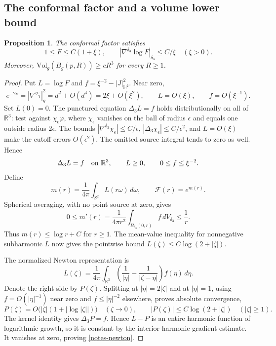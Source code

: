 \documentclass[letterpaper]{amsart}
\newtheorem{prop}[thm]{Proposition}
\theoremstyle{definition}
\theoremstyle{remark}
\def\Vol{\mathrm{Vol}}
\begin{document}
\subsection{The conformal factor and a volume lower bound}\label{subsec-volume}
\begin{prop}\label{prop-conformal-volume}
The conformal factor satisfies
\[
 1\le F\le C(1+\xi),\qquad
 |\nabla^{\delta_3}\log F|_{\delta_3}\le C/\xi\quad(\xi>0).
\]
Moreover, $\Vol_g(B_g(p,R))\ge cR^3$ for every $R\ge1$.
\end{prop}
\begin{proof}
Put $L=\log F$ and $f=\xi^{-2}-|J|_{\mathbb H^2}^2$. Near zero,
\[
 e^{-2\nu}=|\nabla^g\tilde\tau|_g^2=d^2+O(d^4)=2\xi+O(\xi^2),
 \qquad L=O(\xi),\qquad f=O(\xi^{-1}).
\]
Set $L(0)=0$. The punctured equation $\Delta_3L=f$ holds distributionally on all of $\mathbb R^3$: test against $\chi_\epsilon\varphi$, where $\chi_\epsilon$ vanishes on the ball of radius $\epsilon$ and equals one outside radius $2\epsilon$. The bounds $|\nabla^{\delta_3}\chi_\epsilon|\le C/\epsilon$, $|\Delta_3\chi_\epsilon|\le C/\epsilon^2$, and $L=O(\xi)$ make the cutoff errors $O(\epsilon^2)$. The omitted source integral tends to zero as well. Hence
\[
 \Delta_3L=f\quad\hbox{on }\mathbb R^3,\qquad
 L\ge0,\qquad 0\le f\le\xi^{-2}.
\]
Define
\[
 m(r)=\frac1{4\pi}\int_{S^2}L(r\omega)\,d\omega,
 \qquad \mathcal F(r)=e^{m(r)}.
\]
Spherical averaging, with no point source at zero, gives
\[
 0\le m'(r)=\frac1{4\pi r^2}\int_{B_{\delta_3}(0,r)}f\,dV_{\delta_3}
       \le\frac1r.
\]
Thus $m(r)\le\log r+C$ for $r\ge1$. The mean-value inequality for nonnegative subharmonic $L$ now gives the pointwise bound $L(\zeta)\le C\log(2+|\zeta|)$.

The normalized Newton representation is
\begin{equation}\label{notes-newton}
 L(\zeta)=\frac1{4\pi}\int_{\mathbb R^3}
 \left(\frac1{|\eta|}-\frac1{|\zeta-\eta|}\right)f(\eta)\,d\eta.
\end{equation}
Denote the right side by $P(\zeta)$. Splitting at $|\eta|=2|\zeta|$ and at $|\eta|=1$, using $f=O(|\eta|^{-1})$ near zero and $f\le|\eta|^{-2}$ elsewhere, proves absolute convergence,
\[
 P(\zeta)=O\bigl(|\zeta|(1+|\log|\zeta||)\bigr)\quad(\zeta\to0),
 \qquad |P(\zeta)|\le C\log(2+|\zeta|)\quad(|\zeta|\ge1).
\]
The kernel identity gives $\Delta_3P=f$. Hence $L-P$ is an entire harmonic function of logarithmic growth, so it is constant by the interior harmonic gradient estimate. It vanishes at zero, proving \eqref{notes-newton}.


\end{proof}
\end{document}
